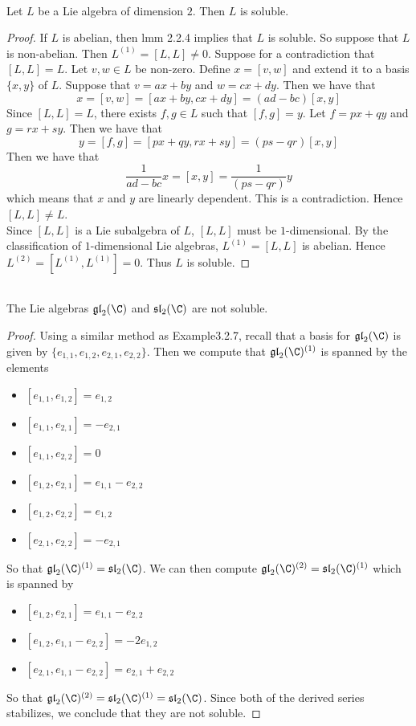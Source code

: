 \documentclass[a4paper]{article}
\begin{document}
\begin{prp}{}{} \\Let $L$ be a Lie algebra of dimension $2$. Then $L$ is soluble. 
\begin{proof}
If $L$ is abelian, then lmm 2.2.4 implies that $L$ is soluble. So suppose that $L$ is non-abelian. Then $L^{(1)}=[L,L]\neq 0$. Suppose for a contradiction that $[L,L]=L$. Let $v,w\in L$ be non-zero. Define $x=[v,w]$ and extend it to a basis $\{x,y\}$ of $L$. Suppose that $v=ax+by$ and $w=cx+dy$. Then we have that $$x=[v,w]=[ax+by,cx+dy]=(ad-bc)[x,y]$$ Since $[L,L]=L$, there exists $f,g\in L$ such that $[f,g]=y$. Let $f=px+qy$ and $g=rx+sy$. Then we have that $$y=[f,g]=[px+qy,rx+sy]=(ps-qr)[x,y]$$ Then we have that $$\frac{1}{ad-bc}x=[x,y]=\frac{1}{(ps-qr)}y$$ which means that $x$ and $y$ are linearly dependent. This is a contradiction. Hence $[L,L]\neq L$. \\

Since $[L,L]$ is a Lie subalgebra of $L$, $[L,L]$ must be $1$-dimensional. By the classification of $1$-dimensional Lie algebras, $L^{(1)}=[L,L]$ is abelian. Hence $L^{(2)}=[L^{(1)},L^{(1)}]=0$. Thus $L$ is soluble. 
\end{proof}
\end{prp}

\begin{eg}{}{} \\The Lie algebras $\mathfrak{gl}_2(\C)$ and $\mathfrak{sl}_2(\C)$ are not soluble. 
\begin{proof}
Using a similar method as Example3.2.7, recall that a basis for $\mathfrak{gl}_2(\C)$ is given by $\{e_{1,1},e_{1,2},e_{2,1},e_{2,2}\}$. Then we compute that $\mathfrak{gl}_2(\C)^{(1)}$ is spanned by the elements
\begin{itemize}
\item $[e_{1,1},e_{1,2}]=e_{1,2}$
\item $[e_{1,1},e_{2,1}]=-e_{2,1}$
\item $[e_{1,1},e_{2,2}]=0$
\item $[e_{1,2},e_{2,1}]=e_{1,1}-e_{2,2}$
\item $[e_{1,2},e_{2,2}]=e_{1,2}$
\item $[e_{2,1},e_{2,2}]=-e_{2,1}$
\end{itemize}
So that $\mathfrak{gl}_2(\C)^{(1)}=\mathfrak{sl}_2(\C)$. We can then compute $\mathfrak{gl}_2(\C)^{(2)}=\mathfrak{sl}_2(\C)^{(1)}$ which is spanned by 
\begin{itemize}
\item $[e_{1,2},e_{2,1}]=e_{1,1}-e_{2,2}$
\item $[e_{1,2},e_{1,1}-e_{2,2}]=-2e_{1,2}$
\item $[e_{2,1},e_{1,1}-e_{2,2}]=e_{2,1}+e_{2,2}$
\end{itemize}
So that $\mathfrak{gl}_2(\C)^{(2)}=\mathfrak{sl}_2(\C)^{(1)}=\mathfrak{sl}_2(\C)$. Since both of the derived series stabilizes, we conclude that they are not soluble. 
\end{proof}
\end{eg}
\end{document}
